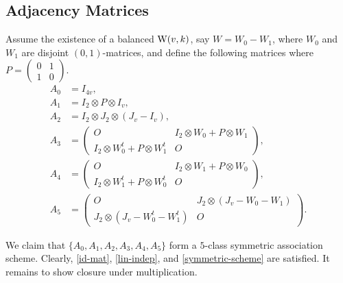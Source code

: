 \documentclass[../../../main]{subfiles}
\begin{document}
\subsection{Adjacency Matrices}

 Assume the existence of a balanced $\text{W}(v,k)$, say $W = W_0 - W_1$, where $W_0$ and $W_1$ are disjoint $(0,1)$-matrices, and define the following matrices where $P=\left(\begin{smallmatrix} 0&1\\1&0 \end{smallmatrix}\right)$.
 \begin{align*}
  A_0 &= I_{4v}, \\
  A_1 &= I_2 \otimes P \otimes I_v, \\
  A_2 &= I_2 \otimes J_2 \otimes (J_v-I_v), \\
  A_3 &= \left(\begin{array}{cc}
          O & I_2 \otimes W_0 + P \otimes W_1 \\
          I_2 \otimes W_0^t + P \otimes W_1^t & O
         \end{array}\right), \\
  A_4 &= \left(\begin{array}{cc}
          O & I_2 \otimes W_1 + P \otimes W_0 \\
          I_2 \otimes W_1^t + P \otimes W_0^t & O
         \end{array}\right), \\
  A_5 &= \left(\begin{array}{cc}
          O & J_2 \otimes (J_v - W_0 - W_1) \\
          J_2 \otimes (J_v - W_0^t - W_1^t) & O
         \end{array}\right).
 \end{align*}
 
 We claim that $\{A_0, A_1,A_2,A_3,A_4,A_5\}$ form a $5$-class symmetric association scheme. Clearly, \ref{id-mat}, \ref{lin-indep}, and \ref{symmetric-scheme} are satisfied. It remains to show closure under multiplication. 
 
\end{document}
